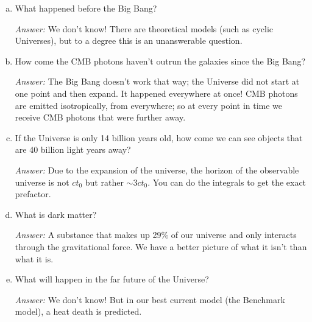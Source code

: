 \begin{enumerate}[(a)]
  \item What happened before the Big Bang?

  \textit{Answer:} We don't know! There are theoretical models (such as cyclic Universes), but to a degree this is an unanswerable question.



  \item How come the CMB photons haven't outrun the galaxies since the Big Bang?

  \textit{Answer:} The Big Bang doesn't work that way; the Universe did not start at one point and then expand. It happened everywhere at once! CMB photons are emitted isotropically, from everywhere; so at every point in time we receive CMB photons that were further away.

  \item If the Universe is only 14 billion years old, how come we can see objects that are 40 billion light years away?

  \textit{Answer:} Due to the expansion of the universe, the horizon of the observable universe is not $ct_0$ but rather $\sim 3ct_0$. You can do the integrals to get the exact prefactor.

  \item What is dark matter?

  \textit{Answer:} A substance that makes up 29\% of our universe and only interacts through the gravitational force. We have a better picture of what it isn't than what it is.

  \item What will happen in the far future of the Universe?

  \textit{Answer:} We don't know! But in our best current model (the Benchmark model), a heat death is predicted.
\end{enumerate}
